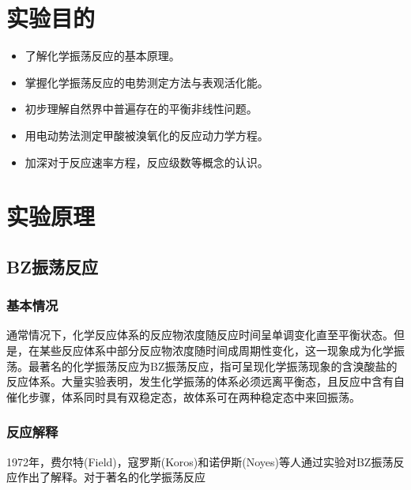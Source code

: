 \documentclass[12pt,hyperref,a4paper,UTF8]{ctexart}
\begin{document}
\cover

%
%

\thispagestyle{empty} %

\newpage
\tableofcontents

\newpage


\section{实验目的}
\begin{itemize}
    \item 了解化学振荡反应的基本原理。
    \item 掌握化学振荡反应的电势测定方法与表观活化能。
    \item 初步理解自然界中普遍存在的平衡非线性问题。
    \item 用电动势法测定甲酸被溴氧化的反应动力学方程。
    \item 加深对于反应速率方程，反应级数等概念的认识。
\end{itemize}

\section{实验原理}
\subsection{BZ振荡反应}
\subsubsection{基本情况}
通常情况下，化学反应体系的反应物浓度随反应时间呈单调变化直至平衡状态。但是，在某些反应体系中部分反应物浓度随时间成周期性变化，这一现象成为化学振荡。最著名的化学振荡反应为BZ振荡反应，指可呈现化学振荡现象的含溴酸盐的反应体系。大量实验表明，发生化学振荡的体系必须远离平衡态，且反应中含有自催化步骤，体系同时具有双稳定态，故体系可在两种稳定态中来回振荡。

\subsubsection{反应解释}
1972年，费尔特(Field)，寇罗斯(Koros)和诺伊斯(Noyes)等人通过实验对BZ振荡反应作出了解释。对于著名的化学振荡反应
\end{document}
